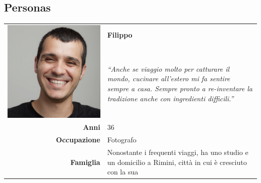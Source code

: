 \subsection{Personas}
\begin{table}[H]
	\begin{centering}
	\begin{tabular} { | r  p{12cm} | }
		\hline
		\multirow{2}{*}{
			\begin{minipage}{.15 \textheight}
				\vspace{0.1in}
				\includegraphics[width=\linewidth]{img/personas/filippo.png}
			\end{minipage}
		}
		 & \vspace{0.1 in}\Large\textbf{Filippo} \\ 
		& \vspace{0.1 in}\large{\emph{``Anche se viaggio molto per catturare il mondo,
cucinare all'estero mi fa
		sentire sempre a casa. Sempre pronto a re-inventare la tradizione anche con
		ingredienti difficili.''}}\\[8ex] 
		\hline
		\textbf{Anni} & 36 \\ \hline
		\textbf{Occupazione} & Fotografo \\ \hline
		\textbf{Famiglia} & {Nonostante i frequenti viaggi, ha uno
studio e un domicilio a Rimini, città in cui è cresciuto con la sua
}
\end{tabular}
\end{centering}
\end{table}
